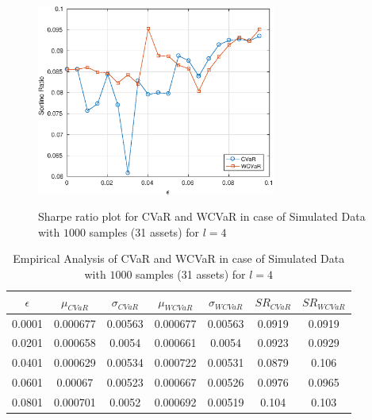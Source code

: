 \documentclass[12pt]{article}
\numberwithin{equation}{section}
\begin{document}
\begin{figure}[!h]
    \centering
   
    \includegraphics[height=7.0cm,width=0.7\textwidth]{CVaR/bse30_simulated/sr_1000_4.eps}

   \caption{Sharpe ratio plot for CVaR and WCVaR in case of Simulated Data with $1000$ samples (31 assets) for $l=4$}
   \label{fig:6.3}
\end{figure}

\begin{table}[!h]
    \centering
    \captionsetup{justification=centering}

   \begin{tabular}{||c|c|c|c|c|c|c||}
   \hline
  
$\epsilon$ & $\mu_{CVaR}$ & $\sigma_{CVaR}$ & $\mu_{WCVaR}$ & $\sigma_{WCVaR}$ & $SR_{CVaR}$ & $SR_{WCVaR}$\\
  
  \hline
0.0001 & 0.000677 & 0.00563 & 0.000677 & 0.00563 & 0.0919 & 0.0919 \\
0.0201 & 0.000658 & 0.0054 & 0.000661 & 0.0054 & 0.0923 & 0.0929 \\
0.0401 & 0.000629 & 0.00534 & 0.000722 & 0.00531 & 0.0879 & 0.106 \\
0.0601 & 0.00067 & 0.00523 & 0.000667 & 0.00526 & 0.0976 & 0.0965 \\
0.0801 & 0.000701 & 0.0052 & 0.000692 & 0.00519 & 0.104 & 0.103 \\
  \hline
\end{tabular}
    \caption{Empirical Analysis of CVaR and WCVaR in case of Simulated Data with $1000$ samples (31 assets) for $l=4$}
    \label{tab:6.3}
\end{table}
\end{document}
